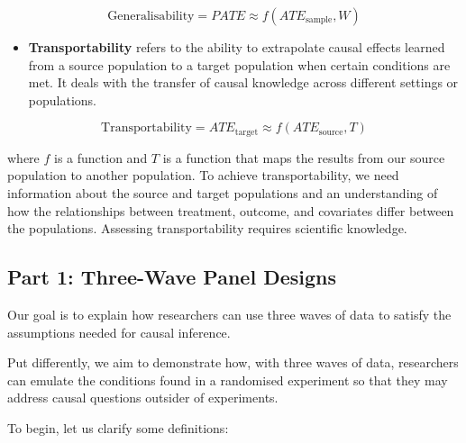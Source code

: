 \documentclass[
  singlecolumn]{article}
\providecommand{\tightlist}{%
  \setlength{\itemsep}{0pt}\setlength{\parskip}{0pt}}\usepackage{longtable,booktabs,array}
\begin{document}
\[\text{Generalisability} = PATE \approx f(ATE_{\text{sample}}, W)\]

\begin{itemize}
\tightlist
\item
  \textbf{Transportability} refers to the ability to extrapolate causal
  effects learned from a source population to a target population when
  certain conditions are met. It deals with the transfer of causal
  knowledge across different settings or populations.
\end{itemize}

\[\text{Transportability} = ATE_{\text{target}} \approx f(ATE_{\text{source}}, T)\]

where \(f\) is a function and \(T\) is a function that maps the results
from our source population to another population. To achieve
transportability, we need information about the source and target
populations and an understanding of how the relationships between
treatment, outcome, and covariates differ between the populations.
Assessing transportability requires scientific knowledge.

\hypertarget{part-1-three-wave-panel-designs}{%
\subsection{Part 1: Three-Wave Panel
Designs}\label{part-1-three-wave-panel-designs}}

Our goal is to explain how researchers can use three waves of data to
satisfy the assumptions needed for causal inference.

Put differently, we aim to demonstrate how, with three waves of data,
researchers can emulate the conditions found in a randomised experiment
so that they may address causal questions outsider of experiments.

To begin, let us clarify some definitions:
\end{document}
